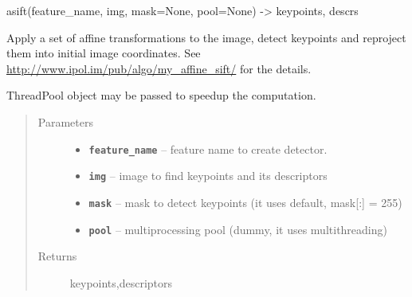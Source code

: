\documentclass[letterpaper,10pt,english]{sphinxmanual}
\begin{document}
\begin{fulllineitems}
\label{RRtoolbox.lib:RRtoolbox.lib.descriptors.ASIFT}
asift(feature\_name, img, mask=None, pool=None) -\textgreater{} keypoints, descrs

Apply a set of affine transformations to the image, detect keypoints and
reproject them into initial image coordinates.
See \href{http://www.ipol.im/pub/algo/my\_affine\_sift/}{http://www.ipol.im/pub/algo/my\_affine\_sift/} for the details.

ThreadPool object may be passed to speedup the computation.
\begin{quote}\begin{description}
\item[{Parameters}] \leavevmode\begin{itemize}
\item {} 
\textbf{\texttt{feature\_name}} -- feature name to create detector.

\item {} 
\textbf{\texttt{img}} -- image to find keypoints and its descriptors

\item {} 
\textbf{\texttt{mask}} -- mask to detect keypoints (it uses default, mask{[}:{]} = 255)

\item {} 
\textbf{\texttt{pool}} -- multiprocessing pool (dummy, it uses multithreading)

\end{itemize}

\item[{Returns}] \leavevmode
keypoints,descriptors

\end{description}\end{quote}

\end{fulllineitems}

\end{document}
